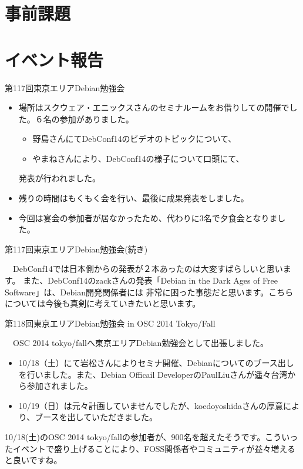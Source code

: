 \section{事前課題}
{\footnotesize

}

\section{イベント報告}

\begin{frame}{第117回東京エリアDebian勉強会}
 
\begin{itemize}
\item 場所はスクウェア・エニックスさんのセミナルームをお借りしての開催でした。６名の参加がありました。
\begin{itemize}
\item 野島さんにてDebConf14のビデオのトピックについて、
\item やまねさんにより、DebConf14の様子について口頭にて、
\end{itemize}
発表が行われました。
\item 残りの時間はもくもく会を行い、最後に成果発表をしました。
\item 今回は宴会の参加者が居なかったため、代わりに3名で夕食会となりました。
\end{itemize} 
\end{frame}

\begin{frame}{第117回東京エリアDebian勉強会(続き)}

　DebConf14では日本側からの発表が２本あったのは大変すばらしいと思います。
また、DebConf14のzackさんの発表「Debian in the Dark Ages of Free Software」は、Debian開発関係者には
非常に困った事態だと思います。こちらについては今後も真剣に考えていきたいと思います。

\end{frame}

\begin{frame}{第118回東京エリアDebian勉強会 in OSC 2014 Tokyo/Fall}

　OSC 2014 tokyo/fallへ東京エリアDebian勉強会として出張しました。 

\begin{itemize}
\item 10/18（土）にて岩松さんによりセミナ開催、Debianについてのブース出しを行いました。また、Debian Officail DeveloperのPaulLiuさんが遥々台湾から参加されました。
\item 10/19（日）は元々計画していませんでしたが、koedoyoshidaさんの厚意により、ブースを出していただきました。
\end{itemize} 
 
 10/18(土)のOSC 2014 tokyo/fallの参加者が、900名を超えたそうです。こういったイベントで盛り上げることにより、FOSS関係者やコミュニティが益々増えると良いですね。
　
\end{frame}


